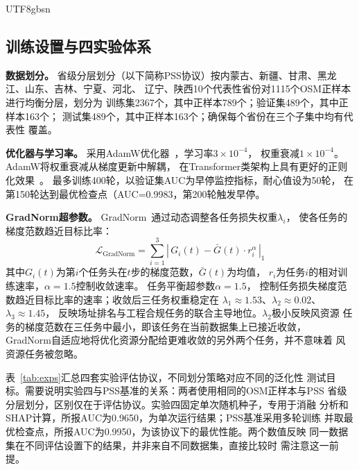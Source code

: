 \documentclass[12pt, a4paper]{article}
\begin{document}
\begin{CJK}{UTF8}{gbsn}
\subsection{训练设置与四实验体系}
\label{sec:training}

\textbf{数据划分。}
省级分层划分（以下简称PSS协议）按内蒙古、新疆、甘肃、黑龙江、山东、吉林、宁夏、河北、
辽宁、陕西10个代表性省份对1115个OSM正样本进行均衡分层，划分为
训练集2367个，其中正样本789个；验证集489个，其中正样本163个；
测试集489个，其中正样本163个；确保每个省份在三个子集中均有代表性
覆盖。

\textbf{优化器与学习率。}
采用AdamW优化器~\cite{loshchilov2019}，学习率$3\times10^{-4}$，
权重衰减$1\times10^{-4}$。AdamW将权重衰减从梯度更新中解耦，
在Transformer类架构上具有更好的正则化效果~\cite{loshchilov2019}。
最多训练400轮，以验证集AUC为早停监控指标，耐心值设为50轮，
在第150轮达到最优检查点（AUC=0.9983，第200轮触发早停。

\textbf{GradNorm超参数。}
GradNorm~\cite{chen2018gradnorm}通过动态调整各任务损失权重$\lambda_i$，
使各任务的梯度范数趋近目标比率：
\begin{equation}
\mathcal{L}_{\text{GradNorm}} = \sum_{i=1}^{3}
\left|\,G_i(t) - \bar{G}(t)\cdot r_i^\alpha\,\right|_1
\label{eq:gradnorm}
\end{equation}
其中$G_i(t)$为第$i$个任务头在$t$步的梯度范数，$\bar{G}(t)$为均值，
$r_i$为任务$i$的相对训练速率，$\alpha=1.5$控制收敛速率。
任务平衡超参数$\alpha=1.5$，
控制任务损失梯度范数趋近目标比率的速率；收敛后三任务权重稳定在
$\lambda_1\approx1.53$、$\lambda_2\approx0.02$、$\lambda_3\approx1.45$，
反映场址排名与工程合规任务的联合主导地位。$\lambda_2$极小反映风资源
任务的梯度范数在三任务中最小，即该任务在当前数据集上已接近收敛，
GradNorm自适应地将优化资源分配给更难收敛的另外两个任务，并不意味着
风资源任务被忽略。

表~\ref{tab:exps}汇总四套实验评估协议，不同划分策略对应不同的泛化性
测试目标。需要说明实验四与PSS基准的关系：两者使用相同的OSM正样本与PSS
省级分层划分，区别仅在于评估协议。实验四固定单次随机种子，专用于消融
分析和SHAP计算，所报AUC为0.9650，为单次运行结果；PSS基准采用多轮训练
并取最优检查点，所报AUC为0.9950，为该协议下的最优性能。两个数值反映
同一数据集在不同评估设置下的结果，并非来自不同数据集，直接比较时
需注意这一前提。


\end{CJK}
\end{document}
